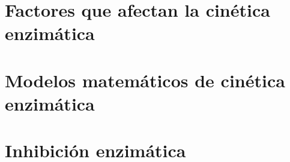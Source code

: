 \documentclass{../summarie}
\begin{document}
    \chapter{Factores que afectan la cinética enzimática}
    \chapter{Modelos matemáticos de cinética enzimática} 
    \chapter{Inhibición enzimática}


\backmatter



\appendix
\end{document}
